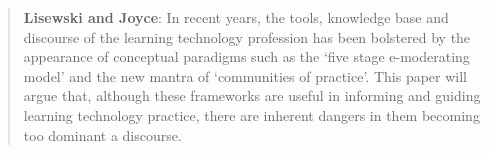 

\begin{quote}
\textbf{Lisewski and Joyce}: In recent years, the tools, knowledge base
and discourse of the learning technology profession has been bolstered
by the appearance of conceptual paradigms such as the `five stage
e-moderating model' and the new mantra of `communities of practice'.
This paper will argue that, although these frameworks are useful in
informing and guiding learning technology practice, there are inherent
dangers in them becoming too dominant a discourse.

\end{quote}

